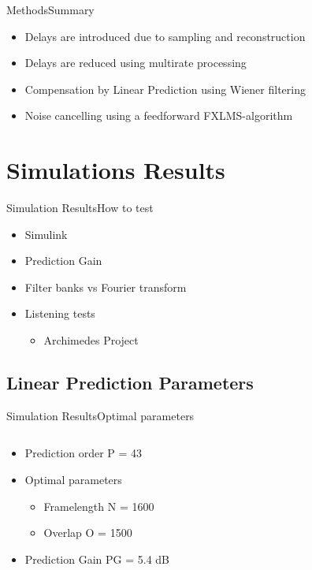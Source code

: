 \begin{frame}{Methods}{Summary}	
\begin{itemize}
	\item Delays are introduced due to sampling and reconstruction
	\item Delays are reduced using multirate processing
	\item Compensation by Linear Prediction using Wiener filtering
	\item Noise cancelling using a feedforward FXLMS-algorithm
\end{itemize}
\end{frame}










\section{Simulations Results}


\begin{frame}{Simulation Results}{How to test}	
\begin{itemize}
	\item Simulink 
	\item Prediction Gain
	\item Filter banks vs Fourier transform
	\item Listening tests
			\begin{itemize}
				\item Archimedes Project
			\end{itemize}
\end{itemize}
\end{frame}

\subsection{Linear Prediction Parameters}
\begin{frame}{Simulation Results}{Optimal parameters}		
\begin{columns}
	\begin{column}{0.4\textwidth}
		\begin{itemize}
			\item Prediction order P = 43
			\item Optimal parameters
			\begin{itemize}
				\item Framelength N = 1600
				\item Overlap O = 1500
			\end{itemize}
			\item Prediction Gain PG = 5.4 dB
		\end{itemize}
	\end{column}
	\begin{column}{0.6\textwidth} 
		\resizebox{0.9\columnwidth}{!}{		
			}
	\end{column}
\end{columns}
\end{frame}

